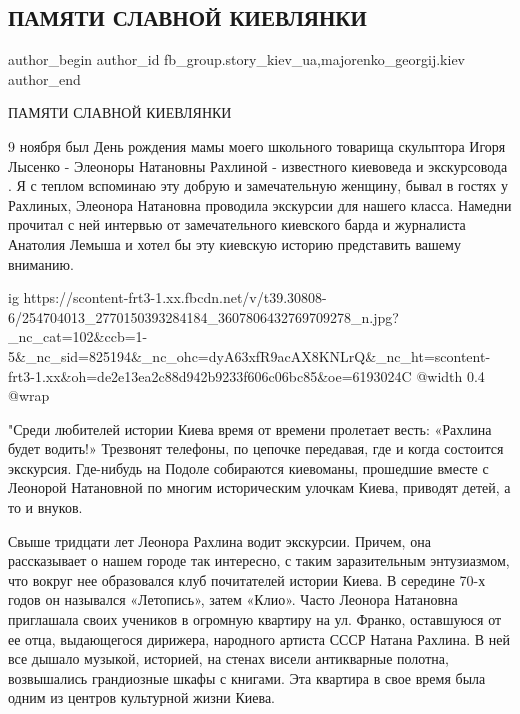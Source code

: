  
 
 
 
 
 
\subsection{ПАМЯТИ СЛАВНОЙ КИЕВЛЯНКИ}
\label{sec:11_11_2021.fb.fb_group.story_kiev_ua.1.pamjat_slavnoj_kievljanki}
 
\ifcmt
 author_begin
   author_id fb_group.story_kiev_ua,majorenko_georgij.kiev
 author_end
\fi

ПАМЯТИ СЛАВНОЙ КИЕВЛЯНКИ

9 ноября был День рождения мамы моего школьного товарища скульптора Игоря
Лысенко - Элеоноры Натановны Рахлиной - известного киевоведа и экскурсовода . Я
с теплом вспоминаю эту добрую и замечательную женщину, бывал в гостях у
Рахлиных, Элеонора Натановна проводила экскурсии для нашего класса. Намедни
прочитал с ней интервью от замечательного киевского барда и журналиста Анатолия
Лемыша и хотел  бы эту киевскую историю представить вашему вниманию.

\ifcmt
  ig https://scontent-frt3-1.xx.fbcdn.net/v/t39.30808-6/254704013_2770150393284184_3607806432769709278_n.jpg?_nc_cat=102&ccb=1-5&_nc_sid=825194&_nc_ohc=dyA63xfR9acAX8KNLrQ&_nc_ht=scontent-frt3-1.xx&oh=de2e13ea2c88d942b9233f606c06bc85&oe=6193024C
  @width 0.4
  @wrap 
\fi

"Среди любителей истории Киева время от времени пролетает весть: «Рахлина будет
водить!» Трезвонят телефоны, по цепочке передавая, где и когда состоится
экскурсия. Где-нибудь на Подоле собираются киевоманы, прошедшие вместе с
Леонорой Натановной по многим историческим улочкам Киева, приводят детей, а то
и внуков. 

Свыше тридцати лет Леонора Рахлина водит экскурсии. Причем, она рассказывает о
нашем городе так интересно, с таким заразительным энтузиазмом, что вокруг нее
образовался клуб почитателей истории Киева. В середине 70-х годов он назывался
«Летопись», затем «Клио». Часто Леонора Натановна приглашала своих учеников в
огромную квартиру на ул. Франко, оставшуюся от ее отца, выдающегося дирижера,
народного артиста СССР Натана Рахлина. В ней все дышало музыкой, историей, на
стенах висели антикварные полотна, возвышались грандиозные шкафы с книгами. Эта
квартира в свое время была одним из центров культурной жизни Киева. 

